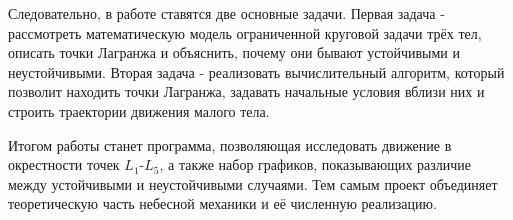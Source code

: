 Следовательно, в работе ставятся две основные задачи. Первая задача -
рассмотреть математическую модель ограниченной круговой задачи трёх тел,
описать точки Лагранжа и объяснить, почему они бывают устойчивыми и
неустойчивыми. Вторая задача - реализовать вычислительный алгоритм, который
позволит находить точки Лагранжа, задавать начальные условия вблизи них и
строить траектории движения малого тела.

Итогом работы станет программа, позволяющая исследовать движение в
окрестности точек $L_1$-$L_5$, а также набор графиков, показывающих различие
между устойчивыми и неустойчивыми случаями. Тем самым проект объединяет
теоретическую часть небесной механики и её численную реализацию.
